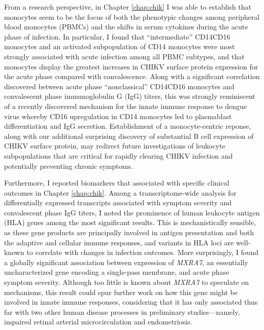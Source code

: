From a research perspective, in Chapter \ref{chap:chik} I was able to establish that monocytes seem to be the focus of both the phenotypic changes among peripheral blood monocytes (PBMCs) and the shifts in serum cytokines during the acute phase of infection. In particular, I found that ``intermediate'' CD14\sups{++}\allowbreak CD16\sups{+} monocytes and an activated subpopulation of CD14\sups{+} monocytes were most strongly associated with acute infection among all PBMC subtypes, and that monocytes display the greatest increases in CHIKV surface protein expression for the acute phase compared with convalescence. Along with a significant correlation discovered between acute phase ``nonclassical'' CD14\sups{+}CD16\sups{++} monocytes and convalescent phase immunoglobulin G (IgG) titers, this was strongly reminiscent of a recently discovered mechanism for the innate immune response to dengue virus whereby CD16 upregulation in CD14\sups{+} monocytes led to plasmablast differentiation and IgG secretion.\autocite{Kwissa2014} Establishment of a monocyte\hyp{}centric reponse, along with our additional surprising discovery of substantial B cell expression of CHIKV surface protein, may redirect future investigations of leukocyte subpopulations that are critical for rapidly clearing CHIKV infection and potentially preventing chronic symptoms.

Furthermore, I reported biomarkers that associated with specific clinical outcomes in Chapter \ref{chap:chik}. Among a transcriptome-wide analysis for differentially expressed transcripts associated with symptom severity and convalescent phase IgG titers, I noted the prominence of human leukocyte antigen (HLA) genes among the most significant results. This is mechanistically sensible, as these gene products are principally involved in antigen presentation and both the adaptive and cellular immune responses, and variants in HLA loci are well-known to correlate with changes in infection outcomes. More surprisingly, I found a globally significant association between expression of \emph{MXRA7}, an essentially uncharacterized gene encoding a single-pass membrane, and acute phase symptom severity. Although too little is known about \emph{MXRA7} to speculate on mechanisms, this result could spur further work on how this gene might be involved in innate immune responses, considering that it has only associated thus far with two other human disease processes in preliminary studies—namely, impaired retinal arterial microcirculation and endometriosis.\autocite{Sim2013,Veiga-Castelli2010}

